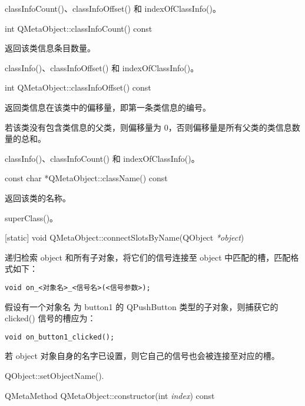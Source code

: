 
\begin{notice}[另请参阅]
classInfoCount()、classInfoOffset() 和 indexOfClassInfo()。
\end{notice}

int QMetaObject::classInfoCount() const

返回该类信息条目数量。

\begin{notice}[另请参阅]
classInfo()、classInfoOffset() 和 indexOfClassInfo()。
\end{notice}

int QMetaObject::classInfoOffset() const

返回类信息在该类中的偏移量，即第一条类信息的编号。

若该类没有包含类信息的父类，则偏移量为 0，否则偏移量是所有父类的类信息数量的总和。

\begin{notice}[另请参阅]
classInfo()、classInfoCount() 和 indexOfClassInfo()。
\end{notice}

const char *QMetaObject::className() const

返回该类的名称。

\begin{notice}[另请参阅]
superClass()。
\end{notice}

[static] void QMetaObject::connectSlotsByName(QObject \emph{*object})

递归检索 object 和所有子对象，将它们的信号连接至 object 中匹配的槽，匹配格式如下：

\begin{lstlisting}
void on_<对象名>_<信号名>(<信号参数>);
\end{lstlisting}

假设有一个对象名 为 button1 的 QPushButton 类型的子对象，则捕获它的 clicked() 信号的槽应为：

\begin{lstlisting}
void on_button1_clicked();
\end{lstlisting}

若 object 对象自身的名字已设置，则它自己的信号也会被连接至对应的槽。

\begin{notice}[另请参阅]
QObject::setObjectName().
\end{notice}

QMetaMethod QMetaObject::constructor(int \emph{index}) const

